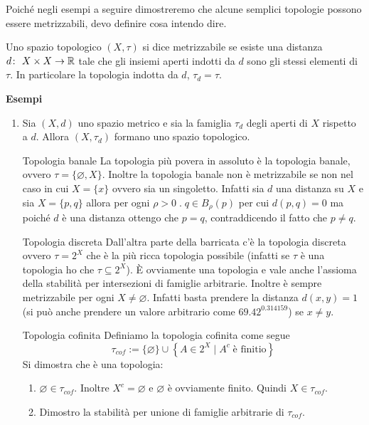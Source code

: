 Poiché negli esempi a seguire dimostreremo che alcune semplici topologie possono essere metrizzabili, devo definire cosa intendo dire.
\begin{definition}
	Uno spazio topologico $(X,\tau)$ si dice metrizzabile se esiste una distanza $d \colon\ X\times X \rightarrow \mathbb{R}$ tale che gli insiemi aperti indotti da $d$ sono gli stessi elementi di $\tau$. In particolare la topologia indotta da $d$, $\tau_d  = \tau$. 
\end{definition}

\textbf{Esempi}
\begin{enumerate}
	\item Sia $(X,d)$ uno spazio metrico e sia la famiglia $\tau_d$ degli aperti di $X$ rispetto a $d$. Allora $(X,\tau_d)$ formano uno spazio topologico. 
	\item[Topologia banale] La topologia più povera in assoluto è la topologia banale, ovvero $\tau = \{\varnothing, X\}$. Inoltre la topologia banale non è metrizzabile se non nel caso in cui $X = \{x\}$ ovvero sia un singoletto. Infatti sia $d$ una distanza su $X$ e sia $X = \{p,q\}$ allora per ogni $\rho > 0 \; . \; q \in B_\rho(p)$ per cui $d(p,q) = 0$ ma poiché $d$ è una distanza ottengo che $p=q$, contraddicendo il fatto che $p \neq q$. 
	\item[Topologia discreta] Dall'altra parte della barricata c'è la topologia discreta ovvero $\tau = 2^X$ che è la più ricca topologia possibile (infatti se $\tau$ è una topologia ho che $\tau \subseteq 2^X$). È ovviamente una topologia e vale anche l'assioma della stabilità per intersezioni di famiglie arbitrarie. Inoltre è sempre metrizzabile per ogni $X \neq \varnothing$. Infatti basta prendere la distanza $d(x,y) = 1$ (si può anche prendere un valore arbitrario come $69.42^{0.314159}$) se $x \neq y$.
	\item[Topologia cofinita] Definiamo la topologia cofinita come segue 
	\begin{equation}
		\tau_{cof} := \{\varnothing\} \cup \left\{ A \in 2^X \; | \; A^c\; \text{è finitio} \right\}
	\end{equation}
	Si dimostra che è una topologia:
	\begin{enumerate}
		\item $\varnothing \in \tau_{cof}$. Inoltre $X^c = \varnothing$ e $\varnothing$ è ovviamente finito. Quindi $X \in \tau_{cof}$.
		\item Dimostro la stabilità per unione di famiglie arbitrarie di $\tau_{cof}$.
			\begin{equation}

\end{equation}
\end{enumerate}
\end{enumerate}
